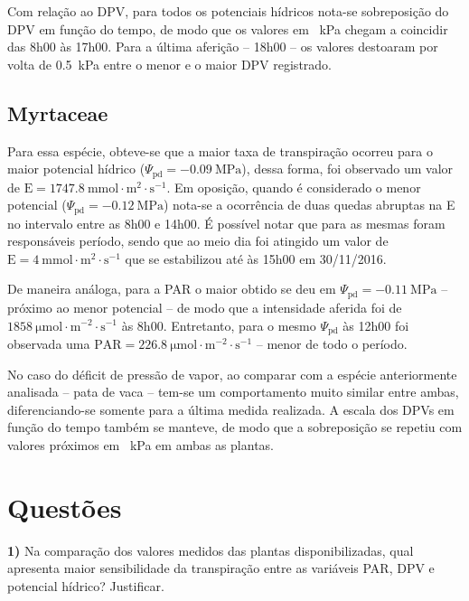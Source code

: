 \documentclass[a4paper, 12pt]{article}
\numberwithin{equation}{section}
\begin{document}
	Com relação ao DPV, para todos os potenciais hídricos nota-se sobreposição do DPV em função do tempo, de modo que os valores em \SI{}{\kilo\pascal} chegam a coincidir das 8h00 às 17h00. Para a última aferição -- 18h00 -- os valores destoaram por volta de \SI{0.5}{\kilo\pascal} entre o menor e o maior DPV registrado.
	
	\subsection{Myrtaceae}
	
	Para essa espécie, obteve-se que a maior taxa de transpiração ocorreu para o maior potencial hídrico ($\Psi_{\textrm{pd}}=\SI{-0.09}{\mega\pascal}$), dessa forma, foi observado um valor de $\textrm{E}=\SI{1747.8}{\milli\mole\cdot\meter^{2}\cdot\second^{-1}}$. Em oposição, quando é considerado o menor potencial ($\Psi_{\textrm{pd}}=\SI{-0.12}{\mega\pascal}$) nota-se a ocorrência de duas quedas abruptas na E no intervalo entre as 8h00 e 14h00. É possível notar que para as mesmas foram responsáveis período, sendo que ao meio dia foi atingido um valor de $\textrm{E}=\SI{4}{\milli\mole\cdot\meter^{2}\cdot\second^{-1}}$ que se estabilizou até às 15h00 em 30/11/2016.
	
	De maneira análoga, para a PAR o maior obtido se deu em $\Psi_{\textrm{pd}}=\SI{-0.11}{\mega\pascal}$ -- próximo ao menor potencial -- de modo que a intensidade aferida foi de $\SI{1858}{\micro\mole\cdot\meter^{-2}\cdot\second^{-1}}$ às 8h00. Entretanto, para o mesmo $\Psi_{\textrm{pd}}$ às 12h00 foi observada uma 
	$\textrm{PAR}=\SI{226.8}{\micro\mole\cdot\meter^{-2}\cdot\second^{-1}}$ -- menor de todo o período.	
	
	No caso do déficit de pressão de vapor, ao comparar com a espécie anteriormente analisada -- pata de vaca -- tem-se um comportamento muito similar entre ambas, diferenciando-se somente para a última medida realizada. A escala dos DPVs em função do tempo também se manteve, de modo que a sobreposição se repetiu com valores próximos em \SI{}{\kilo\pascal} em ambas as plantas.
	
	
	\section{Questões}
	\noindent\textbf{1)} Na comparação dos valores medidos das plantas disponibilizadas, qual apresenta maior sensibilidade da transpiração entre as variáveis PAR, DPV e potencial hídrico? Justificar.\\
	
\end{document}
